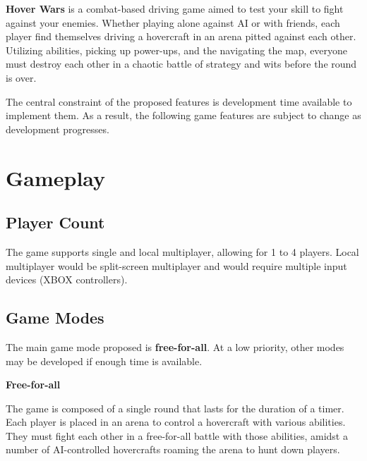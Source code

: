 \documentclass{article}
\newcommand{\namenobold}{Hover Wars}
\newcommand{\name}{\textbf{\namenobold}}
\theoremstyle{definition}
\begin{document}


\name{} is a combat-based driving game aimed to test your skill to fight
against your enemies. Whether playing alone against AI or with friends, each
player find themselves driving a hovercraft in an arena pitted against each
other. Utilizing abilities, picking up power-ups, and the navigating the map,
everyone must destroy each other in a chaotic battle of strategy and wits
before the round is over.

The central constraint of the proposed features is development time available
to implement them. As a result, the following game features are subject to
change as development progresses.

\section{Gameplay}

\subsection{Player Count}

The game supports single and local multiplayer, allowing for 1 to 4 players.
Local multiplayer would be split-screen multiplayer and would require multiple
input devices (XBOX controllers).

\subsection{Game Modes}

The main game mode proposed is \textbf{free-for-all}. At a low priority, other
modes may be developed if enough time is available.

\textbf{Free-for-all}

The game is composed of a single round that lasts for the duration of a timer.
Each player is placed in an arena to control a hovercraft with various
abilities. They must fight each other in a free-for-all battle with those
abilities, amidst a number of AI-controlled hovercrafts roaming the arena to
hunt down players.
\end{document}
